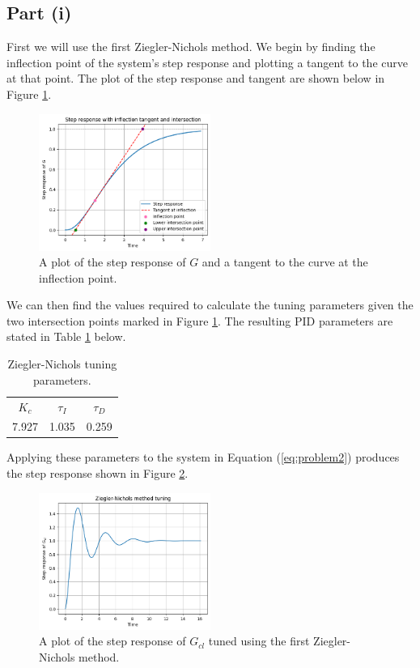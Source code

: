\documentclass[10pt,a4paper]{article}
\begin{document}
    \subsection{Part (i)}
        First we will use the first Ziegler-Nichols method. We begin by finding the inflection point of the system's step response and plotting a tangent to the curve at that point. The plot of the step response and tangent are shown below in Figure \ref{fig:zn1_tangent}.
        \begin{figure}[h]
            \centering
            \includegraphics[width=0.5\textwidth]{zn1_stepRes+tangent.png}
            \caption{A plot of the step response of $G$ and a tangent to the curve at the inflection point.}
            \label{fig:zn1_tangent}
        \end{figure}
        We can then find the values required to calculate the tuning parameters given the two intersection points marked in Figure \ref{fig:zn1_tangent}. The resulting PID parameters are stated in Table \ref{tb:zn1_params} below.
        \begin{table}[h]
            \centering
            \begin{tabular}{ c | c | c }
                $K_c$ & $\tau_I$ & $\tau_D$ \\
                7.927 & 1.035    & 0.259
            \end{tabular}
            \caption{Ziegler-Nichols tuning parameters.}
            \label{tb:zn1_params}
        \end{table}
        Applying these parameters to the system in Equation (\ref{eq:problem2}) produces the step response shown in Figure \ref{fig:zn1_gcl}.
        \begin{figure}[h]
            \centering
            \includegraphics[width=0.5\textwidth]{zn1_Gcl.png}
            \caption{A plot of the step response of $G_{cl}$ tuned using the first Ziegler-Nichols method.}
            \label{fig:zn1_gcl}
        \end{figure}
\end{document}
